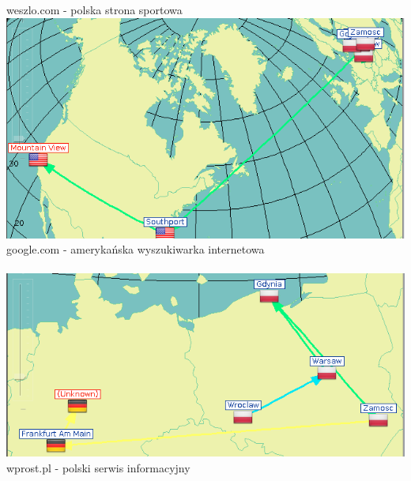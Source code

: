 \documentclass{article}
\begin{document}
\centering weszlo.com - polska strona sportowa
\newpage
  \includegraphics[width=\textwidth]{img2/google.png}
\centering google.com - amerykańska wyszukiwarka internetowa
 \\
\\
  \includegraphics[width=\textwidth]{img2/wprost.png}
\centering wprost.pl - polski serwis informacyjny
\end{document}

